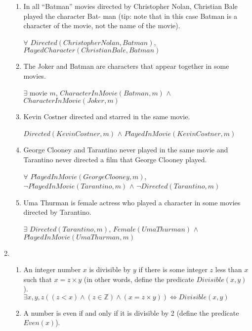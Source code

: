 \documentclass[paper=a4, fontsize=11pt]{scrartcl} %
\numberwithin{equation}{section} %
\numberwithin{figure}{section} %
\numberwithin{table}{section} %
\begin{document}
\begin{enumerate}
\begin{enumerate}
		\item
		In all “Batman” movies directed by Christopher Nolan, Christian Bale played the character Bat-
		man (tip: note that in this case Batman is a character of the movie, not the name of the movie).

		$\forall$ $Directed(Christopher Nolan, Batman)$, $PlayedCharacter(Christian Bale, Batman)$\\
		
		\item
		The Joker and Batman are characters that appear together in some movies.

		$\exists$ movie $m$, $CharacterInMovie(Batman, m)$ $\wedge$ $CharacterInMovie(Joker, m)$\\
		
		\item
		Kevin Costner directed and starred in the same movie.

		$Directed(KevinCostner, m)$ $\wedge$ $PlayedInMovie(KevinCostner, m)$\\
		
		\item
		George Clooney and Tarantino never played in the same movie and Tarantino never directed a film that George Clooney played.
		
		$\forall$ $PlayedInMovie(GeorgeClooney, m)$, $\neg PlayedInMovie(Tarantino, m)$ $\wedge$ $\neg Directed(Tarantino, m)$\\
		\item
		Uma Thurman is female actress who played a character in some movies directed by Tarantino.

		$\exists$ $Directed(Tarantino,m)$, $Female(UmaThurman)$ $\wedge$ $PlayedInMovie(UmaThurman, m)$\\

	\end{enumerate}

	\item
	\begin{enumerate}

		\item
		An integer number $x$ is divisible by $y$ if there is some integer $z$ less than $x$ such that $x = z \times y$ (in other words, define the predicate $Divisible(x, y)$).\\
		
		$\exists x,y,z ((z < x) \land (z \in \mathbb{Z}) \land (x = z \times y)) \Leftrightarrow Divisible(x,y)$\\
		
		\item
		A number is even if and only if it is divisible by 2 (define the predicate $Even(x)$).\\
		

\end{enumerate}
\end{enumerate}
\end{document}
